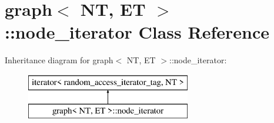 \hypertarget{classgraph_1_1node__iterator}{\section{graph$<$ N\+T, E\+T $>$\+:\+:node\+\_\+iterator Class Reference}
\label{classgraph_1_1node__iterator}
}
Inheritance diagram for graph$<$ N\+T, E\+T $>$\+:\+:node\+\_\+iterator\+:\begin{figure}[H]
\begin{center}
\leavevmode
\includegraphics[height=2.000000cm]{classgraph_1_1node__iterator}
\end{center}
\end{figure}
